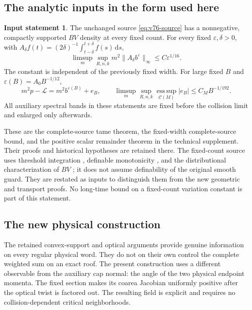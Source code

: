 \documentclass[11pt,reqno]{amsart}
\numberwithin{equation}{section}
\theoremstyle{definition}\newtheorem{definition}[theorem]{Definition}
\theoremstyle{remark}\newtheorem{remark}[theorem]{Remark}
\newcommand{\dd}{\,\mathrm d}\newcommand{\one}{\mathbf1}
\theoremstyle{definition}\newtheorem{inputstatement}[theorem]{Input statement}
\newcommand{\esssup}{\operatorname*{ess\,sup}}
\begin{document}
\subsection{The analytic inputs in the form used here}
\begin{inputstatement}\label{input:v76-analytic}
The unchanged source \eqref{eq:v76-source} has a nonnegative,
compactly supported $BV$ density at every fixed count. For every
fixed $\varepsilon,\delta>0$, with
$A_\delta f(t)=(2\delta)^{-1}\int_{t-\delta}^{t+\delta}f(s)\dd s$,
\begin{equation}\label{eq:v76-average}
 \limsup_m\sup_{R,n,k}m^2\|A_\delta b^\varepsilon\|_\infty
                                      \le C\varepsilon^{1/16}.
\end{equation}
The constant is independent of the previously fixed width. For large
fixed $B$ and $\varepsilon(B)=A_0B^{-1/12}$,
\begin{equation}\label{eq:v76-remainder}
 m^2p-\mathcal L=m^2b^{\varepsilon(B)}+e_B,\qquad
 \limsup_m\sup_{R,n,k}\esssup_{\mathcal C(M)}|e_B|
                                     \le C_MB^{-1/192}.
\end{equation}
All auxiliary spectral bands in these statements are fixed before
the collision limit and enlarged only afterwards.
\end{inputstatement}
These are the complete-source tame theorem, the fixed-width
complete-source bound, and the positive scalar remainder theorem in
the technical supplement. Their proofs and historical hypotheses are
retained there. The fixed-count source uses threshold integration
\cite{CMInt}, definable monotonicity \cite{Coste}, and the
distributional characterization of $BV$ \cite{AFP}; it does not
assume definability of the original smooth guard. They are restated as inputs to distinguish them from
the new geometric and transport proofs. No long-time bound on a
fixed-count variation constant is part of this statement.


\subsection{The new physical construction}
The retained convex-support and optical arguments provide genuine
information on every regular physical word. They do not on their
own control the complete weighted sum on an exact roof. The present
construction uses a different observable from the auxiliary cap
normal: the angle of the two physical endpoint momenta. The fixed
section makes its coarea Jacobian uniformly positive after the
optical twist is factored out. The resulting field is explicit and
requires no collision-dependent critical neighborhoods.
\end{document}
